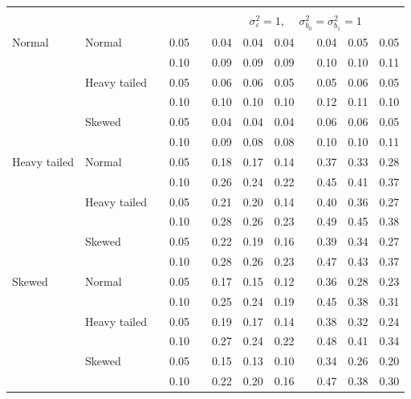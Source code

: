 \documentclass[12pt]{article} %
\begin{document}
\begin{table}[ht]
\begin{scriptsize}
\begin{center}
\begin{tabular}{ll p{.1cm} c p{.1cm} rrr p{.1cm} rrr}
&&&&&&&&&&&\\
& && && \multicolumn{7}{c}{$\sigma_{\varepsilon}^2 = 1$, \ \ $\sigma_{b_0}^2 = \sigma_{b_1}^2 = 1$} \\ \cline{6-12}
Normal       & Normal       && 0.05 &&   0.04 & 0.04 & 0.04 && 0.04 & 0.05 & 0.05 \\ 
             &              && 0.10 &&   0.09 & 0.09 & 0.09 && 0.10 & 0.10 & 0.11 \\ 
             & Heavy tailed && 0.05 &&   0.06 & 0.06 & 0.05 && 0.05 & 0.06 & 0.05 \\ 
             &              && 0.10 &&   0.10 & 0.10 & 0.10 && 0.12 & 0.11 & 0.10 \\ 
             & Skewed       && 0.05 &&   0.04 & 0.04 & 0.04 && 0.06 & 0.06 & 0.05 \\ 
             &              && 0.10 &&   0.09 & 0.08 & 0.08 && 0.10 & 0.10 & 0.11 \\ 
Heavy tailed & Normal       && 0.05 &&   0.18 & 0.17 & 0.14 && 0.37 & 0.33 & 0.28 \\ 
             &              && 0.10 &&   0.26 & 0.24 & 0.22 && 0.45 & 0.41 & 0.37 \\ 
             & Heavy tailed && 0.05 &&   0.21 & 0.20 & 0.14 && 0.40 & 0.36 & 0.27 \\ 
             &              && 0.10 &&   0.28 & 0.26 & 0.23 && 0.49 & 0.45 & 0.38 \\ 
             & Skewed       && 0.05 &&   0.22 & 0.19 & 0.16 && 0.39 & 0.34 & 0.27 \\ 
             &              && 0.10 &&   0.28 & 0.26 & 0.23 && 0.47 & 0.43 & 0.37 \\ 
Skewed       & Normal       && 0.05 &&   0.17 & 0.15 & 0.12 && 0.36 & 0.28 & 0.23 \\ 
             &              && 0.10 &&   0.25 & 0.24 & 0.19 && 0.45 & 0.38 & 0.31 \\ 
             & Heavy tailed && 0.05 &&   0.19 & 0.17 & 0.14 && 0.38 & 0.32 & 0.24 \\ 
             &              && 0.10 &&   0.27 & 0.24 & 0.22 && 0.48 & 0.41 & 0.34 \\ 
             & Skewed       && 0.05 &&   0.15 & 0.13 & 0.10 && 0.34 & 0.26 & 0.20 \\ 
             &              && 0.10 &&   0.22 & 0.20 & 0.16 && 0.47 & 0.38 & 0.30 \\ 



\end{tabular}
\end{center}
\end{scriptsize}
\end{table}
\end{document}

